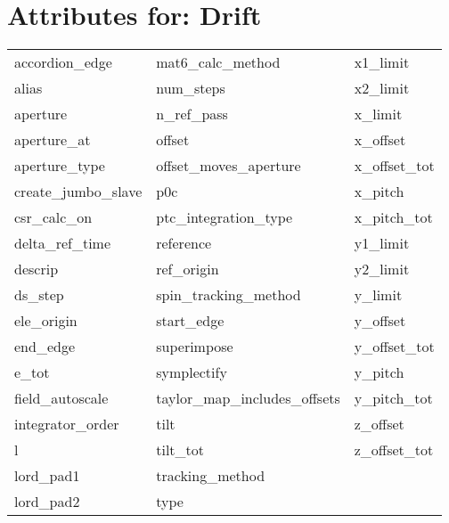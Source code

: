  \section{Attributes for: Drift}
 \label{s:list.drift}
 
 \begin{tabular}{lll} \toprule
accordion_edge              & mat6_calc_method            & x1_limit                    \\
alias                       & num_steps                   & x2_limit                    \\
aperture                    & n_ref_pass                  & x_limit                     \\
aperture_at                 & offset                      & x_offset                    \\
aperture_type               & offset_moves_aperture       & x_offset_tot                \\
create_jumbo_slave          & p0c                         & x_pitch                     \\
csr_calc_on                 & ptc_integration_type        & x_pitch_tot                 \\
delta_ref_time              & reference                   & y1_limit                    \\
descrip                     & ref_origin                  & y2_limit                    \\
ds_step                     & spin_tracking_method        & y_limit                     \\
ele_origin                  & start_edge                  & y_offset                    \\
end_edge                    & superimpose                 & y_offset_tot                \\
e_tot                       & symplectify                 & y_pitch                     \\
field_autoscale                & taylor_map_includes_offsets & y_pitch_tot                 \\
integrator_order            & tilt                        & z_offset                    \\
l                           & tilt_tot                    & z_offset_tot                \\
lord_pad1                   & tracking_method             &                             \\
lord_pad2                   & type                        &                             \\
 \bottomrule
 \end{tabular}
 \vfill
 

